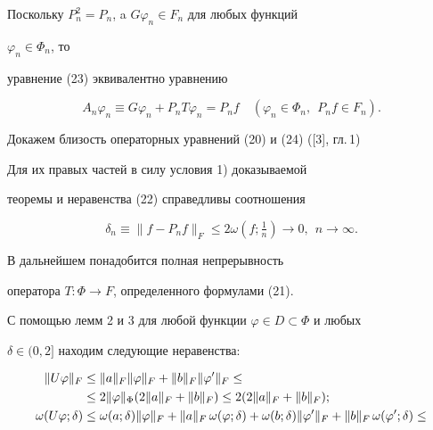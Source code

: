 \begin{pf}
Поскольку $P^2_n=P_n$, a $G\varphi_n\in F_n$ для любых функций 


$\varphi_n\in\Phi_n$, то 


уравнение (23) эквивалентно уравнению 


\begin{equation} 


A_n\varphi_n\equiv G\varphi_n+P_n T\varphi_n=P_n f\quad 


(\varphi_n\in\Phi_n,\ \ P_n f\in F_n). 


\end{equation} 


 


Докажем близость операторных уравнений (20) и (24) ([3], гл.\,1) 


Для их правых частей в силу условия 1) доказываемой 


теоремы и неравенства (22) справедливы соотношения 


$$ 


\delta_n\equiv\|f-P_n f\|_F\le2\omega(f;\tfrac{1}{n})\to0, 


\ \ n\to\infty. 


$$ 


 


В дальнейшем понадобится полная непрерывность 


оператора $T:\Phi\to F$, определенного формулами (21). 


 


С помощью лемм 2 и 3 для любой функции $\varphi\in D\subset\Phi$ и любых 


$\delta\in(0,2]$ находим следующие неравенства: 


\begin{align} 


\|U\varphi\|_F&\le \|a\|_F\|\varphi\|_F+\|b\|_F\|\varphi'\|_F\le\notag \\ 


&\le2\|\varphi\|_\Phi(2\|a\|_F+\|b\|_F)\le2(2\|a\|_F+\|b\|_F); \\ 


% 


\omega(U\varphi;\delta)&\le\omega(a;\delta)\|\varphi\|_F+ 


\|a\|_F\,\omega(\varphi;\delta)+\omega(b;\delta) 


\|\varphi'\|_F+\|b\|_F\,\omega(\varphi';\delta)\le\notag \\ 



\end{align}
\end{pf}
